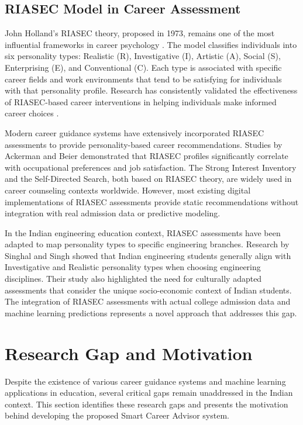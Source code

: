 \documentclass[journal]{IEEEtran}
\begin{document}
\subsection{RIASEC Model in Career Assessment}
John Holland's RIASEC theory, proposed in 1973, remains one of the most influential frameworks in career psychology \cite{holland1997}. The model classifies individuals into six personality types: Realistic (R), Investigative (I), Artistic (A), Social (S), Enterprising (E), and Conventional (C). Each type is associated with specific career fields and work environments that tend to be satisfying for individuals with that personality profile. Research has consistently validated the effectiveness of RIASEC-based career interventions in helping individuals make informed career choices \cite{spokane2003}.

Modern career guidance systems have extensively incorporated RIASEC assessments to provide personality-based career recommendations. Studies by Ackerman and Beier \cite{ackerman2003} demonstrated that RIASEC profiles significantly correlate with occupational preferences and job satisfaction. The Strong Interest Inventory and the Self-Directed Search, both based on RIASEC theory, are widely used in career counseling contexts worldwide. However, most existing digital implementations of RIASEC assessments provide static recommendations without integration with real admission data or predictive modeling.

In the Indian engineering education context, RIASEC assessments have been adapted to map personality types to specific engineering branches. Research by Singhal and Singh \cite{singhal2019} showed that Indian engineering students generally align with Investigative and Realistic personality types when choosing engineering disciplines. Their study also highlighted the need for culturally adapted assessments that consider the unique socio-economic context of Indian students. The integration of RIASEC assessments with actual college admission data and machine learning predictions represents a novel approach that addresses this gap.

\section{Research Gap and Motivation}

Despite the existence of various career guidance systems and machine learning applications in education, several critical gaps remain unaddressed in the Indian context. This section identifies these research gaps and presents the motivation behind developing the proposed Smart Career Advisor system.
\end{document}
